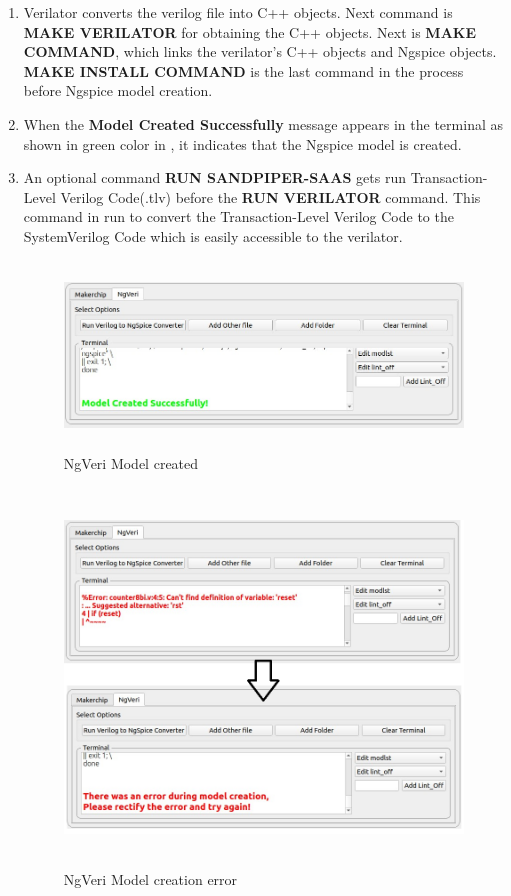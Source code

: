 \begin{enumerate}
\item Verilator converts the verilog file into C++ objects. Next command is\textbf{ MAKE VERILATOR} for obtaining the C++ objects. Next is \textbf{MAKE COMMAND}, which links the verilator's C++ objects and Ngspice objects.\textbf{ MAKE INSTALL COMMAND} is the last command in the process before Ngspice model creation.

\item When the \textbf{Model Created Successfully} message appears in the terminal as shown in green color in , it indicates that the Ngspice model is created.

\item An optional command \textbf{RUN SANDPIPER-SAAS} gets run Transaction-Level Verilog Code(.tlv) before the \textbf{RUN VERILATOR} command. This command in run to convert the Transaction-Level Verilog Code to the SystemVerilog Code which is easily accessible to the verilator.
\begin{figure}[H]
\centering
\includegraphics[width = 14cm, height =5cm]{./NgVeri/modelcreated.png}
\caption{NgVeri Model created}
\label{ngmodel}
\end{figure}



\begin{figure}[H]
\centering
\includegraphics[width = 12cm, height =10cm]{./NgVeri/error1.png}
\caption{NgVeri Model creation error}
\label{ngverierror}
\end{figure}


\end{enumerate}
